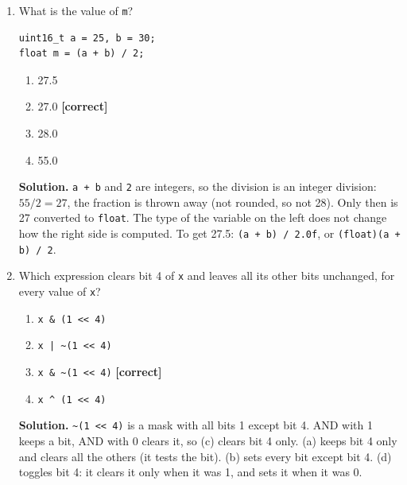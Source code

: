 \documentclass[11pt,a4paper]{article}
\newcommand{\correct}{\quad\textcolor{green!50!black}{\textbf{[correct]}}}
\newenvironment{solution}{\par\noindent\ignorespaces}{\par}
\begin{document}
\begin{enumerate}[label=\textbf{Q\arabic*.}, leftmargin=2.5em, itemsep=6pt]
  \item What is the value of \texttt{m}?
\begin{lstlisting}
uint16_t a = 25, b = 30;
float m = (a + b) / 2;
\end{lstlisting}
  \begin{enumerate}[label=(\alph*)]
    \item 27.5
    \item 27.0 \correct
    \item 28.0
    \item 55.0
  \end{enumerate}
  \begin{solution}
  \textbf{Solution.} \texttt{a + b} and \texttt{2} are integers, so the division is an integer division: $55 / 2 = 27$,
  the fraction is thrown away (not rounded, so not 28). Only then is 27 converted to \texttt{float}. The type of the
  variable on the left does not change how the right side is computed. To get 27.5: \texttt{(a + b) / 2.0f}, or
  \texttt{(float)(a + b) / 2}.
  \end{solution}

  \item Which expression clears bit 4 of \texttt{x} and leaves all its other bits unchanged, for every value of
  \texttt{x}?
  \begin{enumerate}[label=(\alph*)]
    \item \texttt{x \& (1 <{}< 4)}
    \item \texttt{x | \textasciitilde(1 <{}< 4)}
    \item \texttt{x \& \textasciitilde(1 <{}< 4)} \correct
    \item \texttt{x \^{} (1 <{}< 4)}
  \end{enumerate}
  \begin{solution}
  \textbf{Solution.} \texttt{\textasciitilde(1 <{}< 4)} is a mask with all bits 1 except bit 4. AND with 1 keeps a
  bit, AND with 0 clears it, so (c) clears bit 4 only. (a) keeps bit 4 only and clears all the others (it tests the
  bit). (b) sets every bit except bit 4. (d) toggles bit 4: it clears it only when it was 1, and sets it when it was 0.
  \end{solution}


\end{enumerate}
\end{document}
